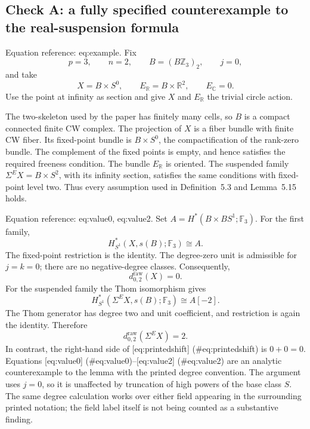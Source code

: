 \documentclass[10pt]{article}
\begin{document}
\subsection*{Check A: a fully specified counterexample to the real-suspension formula}
Equation reference: eq:example. Fix \[p=3,\qquad n=2,\qquad B=(B\mathbb Z_3)_2,\qquad j=0,\] and take \[
 X=B\times S^0,\qquad E_{\mathbb R}=B\times\mathbb R^2,\qquad E_{\mathbb C}=0.\] Use the point at infinity as section and give \(X\) and \(E_{\mathbb R}\) the trivial circle action.\par
The two-skeleton used by the paper has finitely many cells, so \(B\) is a compact connected finite CW complex. The projection of \(X\) is a fiber bundle with finite CW fiber. Its fixed-point bundle is \(B\times S^0\), the compactification of the rank-zero bundle. The complement of the fixed points is empty, and hence satisfies the required freeness condition. The bundle \(E_{\mathbb R}\) is oriented. The suspended family \(\Sigma^E X=B\times S^2\), with its infinity section, satisfies the same conditions with fixed-point level two. Thus every assumption used in Definition 5.3 and Lemma 5.15 holds.\par
Equation reference: eq:value0, eq:value2. Set \(A=H^*(B\times BS^1;\mathbb F_3)\). For the first family, \[H^*_{S^1}(X,s(B);\mathbb F_3)\cong A.\] The fixed-point restriction is the identity. The degree-zero unit is admissible for \(j=k=0\); there are no negative-degree classes. Consequently, \[
 d^{\mathrm{raw}}_{0,2}(X)=0.\] For the suspended family the Thom isomorphism gives \[H^*_{S^1}(\Sigma^E X,s(B);\mathbb F_3)\cong A[-2].\] The Thom generator has degree two and unit coefficient, and restriction is again the identity. Therefore \[
 d^{\mathrm{raw}}_{0,2}(\Sigma^E X)=2.\] In contrast, the right-hand side of [eq:printedshift] (\#eq:printedshift) is \(0+0=0\). Equations [eq:value0] (\#eq:value0)–[eq:value2] (\#eq:value2) are an analytic counterexample to the lemma with the printed degree convention. The argument uses \(j=0\), so it is unaffected by truncation of high powers of the base class \(S\). The same degree calculation works over either field appearing in the surrounding printed notation; the field label itself is not being counted as a substantive finding.\par
\end{document}
